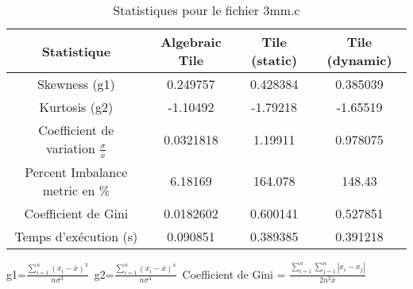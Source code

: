 \documentclass{article}
\begin{document}
\begin{table}[htbp]
  \centering
  \caption{Statistiques pour le fichier 3mm.c}
  \begin{tabular}{|c|c|c|c|}
    \hline
    Statistique & Algebraic Tile & Tile (static) & Tile (dynamic) \\ 
    \hline
    Skewness (g1)  & 0.249757 & 0.428384 & 0.385039 \\ 
    Kurtosis (g2)  & -1.10492 & -1.79218 & -1.65519 \\ 
    Coefficient de variation $ \frac{\sigma}{\overline{x}} $ & 0.0321818 & 1.19911 & 0.978075\\ 
    Percent Imbalance metric en \% & 6.18169 & 164.078 & 148.43\\ 
    Coefficient de Gini  & 0.0182602 & 0.600141 & 0.527851\\ 
    Temps d'exécution (s) &  0.090851    &  0.389385   &  0.391218   \\ 

    \hline
  \end{tabular}
\end{table}
g1=$ \frac{\sum_{i=1}^{n} (x_i - \overline{x})^3}{n\sigma^3} $\
g2=$ \frac{\sum_{i=1}^{n} (x_i - \overline{x})^4}{n\sigma^4} $\
Coefficient de Gini = $ \frac{\sum_{i=1}^{n}\sum_{j=1}^{n} |x_i - x_j|}{2n^2\overline{x}} $\
\newpage
\end{document}
